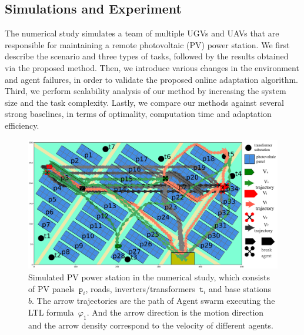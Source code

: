\subsection{Simulations and Experiment}\label{subsec:simulation}


The numerical study simulates a team of multiple UGVs and UAVs
that are responsible for maintaining a remote photovoltaic (PV) power station.
We first describe the scenario and three types of tasks,
followed by the results obtained via the proposed method.
Then, we introduce various changes in the environment and agent failures,
in order to validate the proposed online adaptation algorithm.
Third, we perform scalability analysis of our method by increasing
the system size and the task complexity.
Lastly, we compare our methods against several strong baselines, in terms of
optimality, computation time and adaptation efficiency.


\begin{figure}
\includegraphics[scale=0.18]{figures/background3.pdf}
\caption{Simulated PV power station in the numerical study,
  which consists of PV panels~$\texttt{p}_i$, roads,
  inverters/transformers~$\texttt{t}_i$ and base stations~$b$.
  The arrow trajectories are the path of Agent swarm
  executing the LTL formula~$\varphi_{1}$. And the arrow direction
  is the motion direction and the arrow density correspond to the velocity of different agents.}
\label{fig:workspace}
\end{figure}


